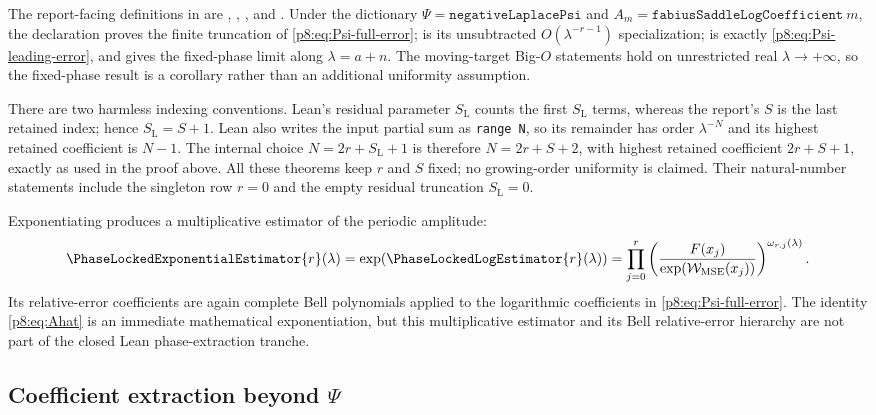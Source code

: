\documentclass[11pt]{article}
\numberwithin{equation}{section}
\theoremstyle{definition}
\theoremstyle{remark}
\begin{document}
The report-facing definitions in
 are
,
,
, and
.  Under the dictionary
$\Psi=\texttt{negativeLaplacePsi}$ and
$A_m=\texttt{fabiusSaddleLogCoefficient}\ m$, the declaration
 proves the
finite truncation of \eqref{p8:eq:Psi-full-error};
 is its
unsubtracted $O(\lambda^{-r-1})$ specialization;
 is exactly
\eqref{p8:eq:Psi-leading-error}, and
 gives the
fixed-phase limit along $\lambda=a+n$.  The moving-target Big-$O$ statements
hold on unrestricted real $\lambda\to+\infty$, so the fixed-phase result is a
corollary rather than an additional uniformity assumption.

There are two harmless indexing conventions.  Lean's residual parameter
$S_{\mathrm L}$ counts the first $S_{\mathrm L}$ terms, whereas the report's
$S$ is the last retained index; hence $S_{\mathrm L}=S+1$.  Lean also writes
the input partial sum as \texttt{range N}, so its remainder has order
$\lambda^{-N}$ and its highest retained coefficient is $N-1$.  The internal
choice $N=2r+S_{\mathrm L}+1$ is therefore
$N=2r+S+2$, with highest retained coefficient $2r+S+1$, exactly as used in
the proof above.  All these theorems keep $r$ and $S$ fixed; no growing-order
uniformity is claimed.  Their natural-number statements include the singleton
row $r=0$ and the empty residual truncation $S_{\mathrm L}=0$.

Exponentiating produces a multiplicative estimator of the periodic amplitude:
\begin{equation}
\PhaseLockedExponentialEstimator{r}(\lambda)
=\exp(\PhaseLockedLogEstimator{r}(\lambda))
=\prod_{j=0}^{r}
\left(\frac{F(x_j)}{\exp(\mathcal W_{\mathrm{MSE}}(x_j))}
\right)^{\omega_{r,j}(\lambda)}.
\label{p8:eq:Ahat}
\end{equation}
Its relative-error coefficients are again complete Bell polynomials applied to the logarithmic coefficients in \cref{p8:eq:Psi-full-error}.
The identity \eqref{p8:eq:Ahat} is an immediate mathematical exponentiation,
but this multiplicative estimator and its Bell relative-error hierarchy are
not part of the closed Lean phase-extraction tranche.

\subsection{Coefficient extraction beyond \texorpdfstring{$\Psi$}{Psi}}
\end{document}
